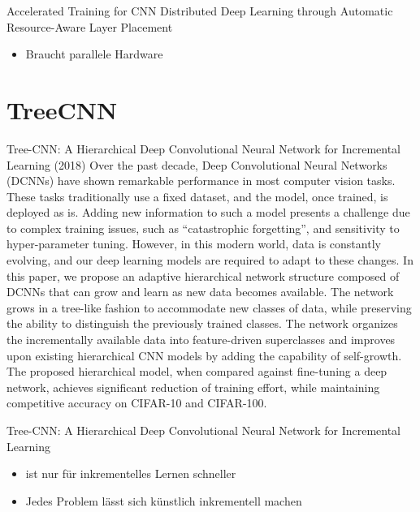\documentclass[10pt]{beamer}
\begin{document}
\begin{frame}{Accelerated Training for CNN Distributed Deep Learning
through Automatic Resource-Aware Layer Placement}
\begin{itemize}
 \item Braucht parallele Hardware
\end{itemize}


\end{frame}

\section{TreeCNN}

\begin{frame}{Tree-CNN: A Hierarchical Deep Convolutional Neural
Network for Incremental Learning (2018)}
Over the past decade, Deep Convolutional Neural Networks (DCNNs) have shown remarkable performance in most computer vision tasks. These tasks traditionally use a fixed dataset, and the model, once trained, is deployed as is. Adding new information to such a model presents a challenge due to complex training issues, such as “catastrophic forgetting”, and sensitivity to hyper-parameter tuning. However, in this modern world, data is constantly evolving, and our deep learning models are required to adapt to these changes. In this paper, we propose an adaptive hierarchical network structure composed of DCNNs that can grow and learn as new data becomes available. The network grows in a tree-like fashion to accommodate new classes of data, while preserving the ability to distinguish the previously trained classes. The network organizes the incrementally available data into feature-driven superclasses and improves upon existing hierarchical CNN models by adding the capability of self-growth. The proposed hierarchical model, when compared against fine-tuning a deep network, achieves significant reduction of training effort, while maintaining competitive accuracy on CIFAR-10 and CIFAR-100.
\end{frame}


\begin{frame}{Tree-CNN: A Hierarchical Deep Convolutional Neural
Network for Incremental Learning}
\begin{itemize}
 \item ist nur für inkrementelles Lernen schneller
 \item Jedes Problem lässt sich künstlich inkrementell machen
\end{itemize}
\end{frame}
\end{document}
